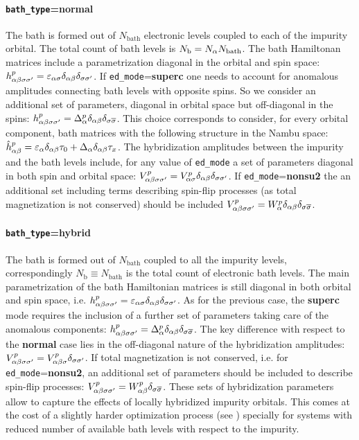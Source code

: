 \documentclass[edipack2.tex]{subfiles}
\begin{document}
\paragraph{{\tt bath\_type}={\bf normal}} The bath is formed out of $N_\mathrm{bath}$
electronic levels coupled to each of the impurity orbital. The total
count of bath levels is $N_\mathrm{b} = N_\alpha N_\mathrm{bath}$. The bath Hamiltonan
matrices include a parametrization diagonal in the orbital and spin space: 
$h^p_{\alpha\beta\sigma\sigma'}=\varepsilon_{\alpha\sigma}\delta_{\alpha\beta}\delta_{\sigma\sigma'}$.
If {\tt ed\_mode}={\bf superc} one needs to account for anomalous
amplitudes connecting bath levels with opposite spins. So we consider
an additional set of parameters, diagonal in orbital space but
off-diagonal in the spins:
$h^p_{\alpha\beta\sigma\sigma'}=\Delta^p_{\alpha}\delta_{\alpha\beta}\delta_{\sigma \overline{\sigma}}$.
This choice corresponds to consider, for every orbital component,
bath matrices with the following structure in the Nambu space:
$\hat{h}^p_{\alpha\beta} = \varepsilon_{\alpha}\delta_{\alpha\beta}\tau_0 +
\Delta_{\alpha}\delta_{\alpha\beta}\tau_x$. 
The hybridization amplitudes between the impurity and the bath levels
include, for any value of {\tt ed\_mode} a set of parameters diagonal in both
spin and orbital space: $V^p_{\alpha\beta\sigma\sigma'}=V^p_{\alpha\sigma}\delta_{\alpha\beta}\delta_{\sigma\sigma'}$.
If {\tt ed\_mode}={\bf nonsu2} the an additional set including terms
describing spin-flip processes (as total magnetization is not
conserved) should be included $V^p_{\alpha\beta\sigma\sigma'} =
W^p_{\alpha}\delta_{\alpha\beta}\delta_{\sigma \overline{\sigma}}$. 



\paragraph{{\tt bath\_type}={\bf hybrid}} The bath is formed out of
$N_\mathrm{bath}$ coupled to all the impurity levels, correspondingly
$N_\mathrm{b}\equiv N_\mathrm{bath}$ is the total count of electronic bath levels. 
The main parametrization of the bath Hamiltonian matrices is still
diagonal in both orbital and spin space, i.e.
$h^p_{\alpha\beta\sigma\sigma'}=\varepsilon_{\alpha\sigma}\delta_{\alpha\beta}\delta_{\sigma\sigma'}$.
As for the previous case, the {\bf superc} mode requires the inclusion
of a further set of parameters taking care of the anomalous components:
$h^p_{\alpha\beta\sigma\sigma'}=\Delta^p_{\alpha}\delta_{\alpha\beta}\delta_{\sigma
  \overline{\sigma}}$.
The key difference with respect to the {\bf normal} case lies in the
off-diagonal nature of the hybridization amplitudes:
$V^p_{\alpha\beta\sigma\sigma'}=V^p_{\alpha\beta\sigma}\delta_{\sigma\sigma'}$. If total magnetization
is not conserved, i.e. for {\tt ed\_mode}={\bf nonsu2}, an additional
set of parameters should be included to describe spin-flip processes:
$V^p_{\alpha\beta\sigma\sigma'} = W^p_{\alpha\beta}\delta_{\sigma \overline{\sigma}}$. 
These sets of hybridization parameters allow to capture the effects of locally
hybridized impurity orbitals. This comes at the cost of a
slightly harder optimization process (see ) specially
for systems with reduced number of available bath levels with respect
to the impurity. 
\end{document}
